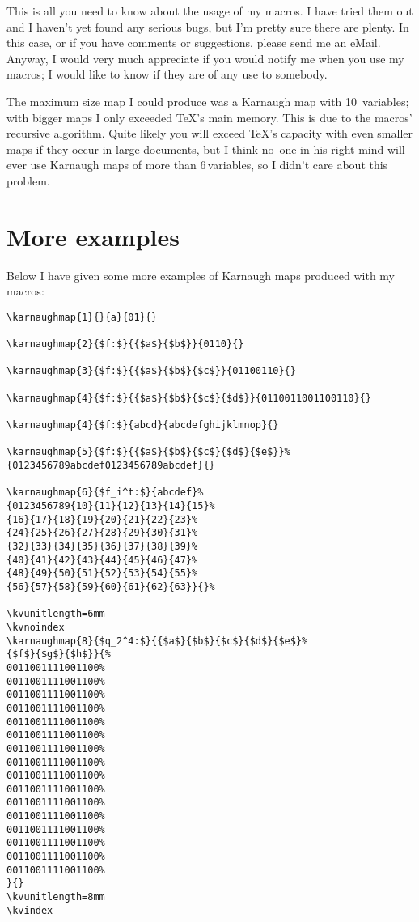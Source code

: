 \documentclass{article}
\begin{document}
This is all you need to know about the usage of my macros. I have tried them
out and I haven't yet found any serious bugs, but I'm pretty sure there are
plenty. In this case, or if you have comments or suggestions,  please send me
an eMail. Anyway, I would very much appreciate if you would notify me when you
use my macros; I would like to know if they are of any use to somebody.

The maximum size map I could produce was a Karnaugh map with 10~variables;
with bigger maps I only exceeded \TeX's main memory. This is due to the
macros' recursive algorithm. Quite likely you will exceed \TeX's capacity with
even smaller maps if they occur in large documents, but I think no~one in his
right mind will ever use Karnaugh maps of more than 6\,variables, so I didn't
care about this problem.


\section{More examples}

Below I have given some more examples of Karnaugh maps produced with my
macros:

\begin{verbatim}
\karnaughmap{1}{}{a}{01}{}
  
\karnaughmap{2}{$f:$}{{$a$}{$b$}}{0110}{}
  
\karnaughmap{3}{$f:$}{{$a$}{$b$}{$c$}}{01100110}{}
  
\karnaughmap{4}{$f:$}{{$a$}{$b$}{$c$}{$d$}}{0110011001100110}{}
  
\karnaughmap{4}{$f:$}{abcd}{abcdefghijklmnop}{}

\karnaughmap{5}{$f:$}{{$a$}{$b$}{$c$}{$d$}{$e$}}%
{0123456789abcdef0123456789abcdef}{}

\karnaughmap{6}{$f_i^t:$}{abcdef}%
{0123456789{10}{11}{12}{13}{14}{15}%
{16}{17}{18}{19}{20}{21}{22}{23}%
{24}{25}{26}{27}{28}{29}{30}{31}%
{32}{33}{34}{35}{36}{37}{38}{39}%
{40}{41}{42}{43}{44}{45}{46}{47}%
{48}{49}{50}{51}{52}{53}{54}{55}%
{56}{57}{58}{59}{60}{61}{62}{63}}{}%

\kvunitlength=6mm
\kvnoindex
\karnaughmap{8}{$q_2^4:$}{{$a$}{$b$}{$c$}{$d$}{$e$}%
{$f$}{$g$}{$h$}}{%
0011001111001100%
0011001111001100%
0011001111001100%
0011001111001100%
0011001111001100%
0011001111001100%
0011001111001100%
0011001111001100%
0011001111001100%
0011001111001100%
0011001111001100%
0011001111001100%
0011001111001100%
0011001111001100%
0011001111001100%
0011001111001100%
}{}
\kvunitlength=8mm
\kvindex
\end{verbatim}
\end{document}
